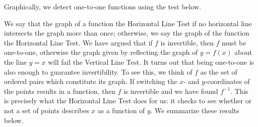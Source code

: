 \smallskip


\smallskip

Graphically, we detect one-to-one functions using the test below.

\smallskip


\smallskip

We say that the graph of a function  the Horizontal Line Test  if no horizontal line intersects the graph more than once; otherwise, we say the graph of the function  the Horizontal Line Test.  We have argued that if $f$ is invertible, then $f$ must be one-to-one, otherwise the graph given by reflecting the graph of $y = f(x)$ about the line $y = x$ will fail the Vertical Line Test. It turns out that being one-to-one is also enough to guarantee invertibility.  To see this, we think of $f$ as the set of ordered pairs which constitute its graph.  If switching the $x$- and $y$-coordinates of the points results in a function, then $f$ is invertible and we have found $f^{-1}$. This is precisely what the Horizontal Line Test does for us:  it checks to see whether or not a set of points describes $x$ as a function of $y$.  We summarize these results below.
  
\smallskip


